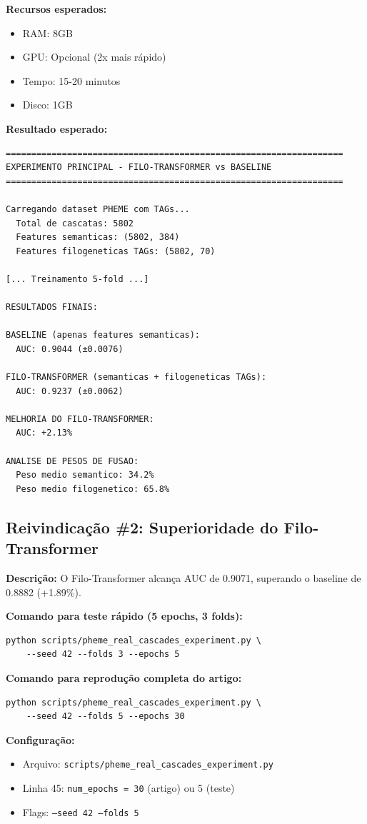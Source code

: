 \documentclass[12pt]{article}
\begin{document}
\textbf{Recursos esperados:}
\begin{itemize}
    \item RAM: 8GB
    \item GPU: Opcional (2x mais r\'apido)
    \item Tempo: 15-20 minutos
    \item Disco: 1GB
\end{itemize}

\textbf{Resultado esperado:}
\begin{verbatim}
==================================================================
EXPERIMENTO PRINCIPAL - FILO-TRANSFORMER vs BASELINE
==================================================================

Carregando dataset PHEME com TAGs...
  Total de cascatas: 5802
  Features semanticas: (5802, 384)
  Features filogeneticas TAGs: (5802, 70)

[... Treinamento 5-fold ...]

RESULTADOS FINAIS:

BASELINE (apenas features semanticas):
  AUC: 0.9044 (±0.0076)

FILO-TRANSFORMER (semanticas + filogeneticas TAGs):
  AUC: 0.9237 (±0.0062)

MELHORIA DO FILO-TRANSFORMER:
  AUC: +2.13%

ANALISE DE PESOS DE FUSAO:
  Peso medio semantico: 34.2%
  Peso medio filogenetico: 65.8%
\end{verbatim}

\subsection{Reivindica\c{c}\~ao \#2: Superioridade do Filo-Transformer}

\textbf{Descri\c{c}\~ao:} O Filo-Transformer alcan\c{c}a AUC de 0.9071, superando o baseline de 0.8882 (+1.89\%).

\textbf{Comando para teste r\'apido (5 epochs, 3 folds):}
\begin{verbatim}
python scripts/pheme_real_cascades_experiment.py \
    --seed 42 --folds 3 --epochs 5
\end{verbatim}

\textbf{Comando para reprodu\c{c}\~ao completa do artigo:}
\begin{verbatim}
python scripts/pheme_real_cascades_experiment.py \
    --seed 42 --folds 5 --epochs 30
\end{verbatim}

\textbf{Configura\c{c}\~ao:}
\begin{itemize}
    \item Arquivo: \texttt{scripts/pheme\_real\_cascades\_experiment.py}
    \item Linha 45: \texttt{num\_epochs = 30} (artigo) ou 5 (teste)
    \item Flags: \texttt{--seed 42 --folds 5}
\end{itemize}
\end{document}
